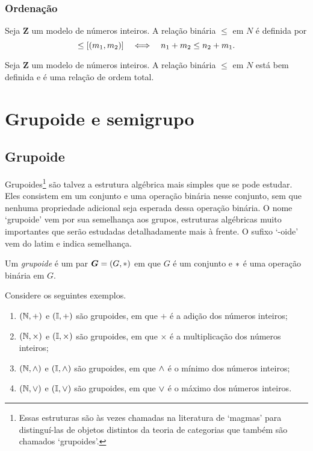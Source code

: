 \subsubsection{Ordenação}

\begin{definition}
	Seja $\bm Z$ um modelo de números inteiros. A relação binária $\leq$ em $N$ é definida por
	\begin{equation*}
	[(n_1,n_2)] \leq [(m_1,m_2)] \sse n_1+m_2 \leq n_2+m_1.
	\end{equation*}
\end{definition}

\begin{exercise}
	Seja $\bm Z$ um modelo de números inteiros. A relação binária $\leq$ em $N$ está bem definida e é uma relação de ordem total.
\end{exercise}


\section{Grupoide e semigrupo}

\subsection{Grupoide}

Grupoides\footnote{Essas estruturas são às vezes chamadas na literatura de `magmas' para distinguí-las de objetos distintos da teoria de categorias que também são chamados `grupoides'.} são talvez a estrutura algébrica mais simples que se pode estudar. Eles consistem em um conjunto e uma operação binária nesse conjunto, sem que nenhuma propriedade adicional seja esperada dessa operação binária. O nome `grupoide' vem por sua semelhança aos grupos, estruturas algébricas muito importantes que serão estudadas detalhadamente mais à frente. O sufixo `-oide' vem do latim e indica semelhança.

\begin{definition}
Um \emph{grupoide} é um par $\bm G=(G,\ast)$ em que $G$ é um conjunto e $\ast$ é uma operação binária em $G$.
\end{definition}

\begin{example}
Considere os seguintes exemplos.
	\begin{enumerate}
	\item $(\mathbb{N},+)$ e $(\mathbb{I},+)$ são grupoides, em que $+$ é a adição dos números inteiros;
	\item $(\mathbb{N},\times)$ e $(\mathbb{I},\times)$ são grupoides, em que $\times$ é a multiplicação dos números inteiros;
	\item $(\mathbb{N},\mathbin{\wedge})$ e $(\mathbb{I},\mathbin{\wedge})$ são grupoides, em que $\mathbin{\wedge}$ é o mínimo dos números inteiros;
	\item $(\mathbb{N},\mathbin{\vee})$ e $(\mathbb{I},\mathbin{\vee})$ são grupoides, em que $\mathbin{\vee}$ é o máximo dos números inteiros.
	\end{enumerate}
\end{example}

